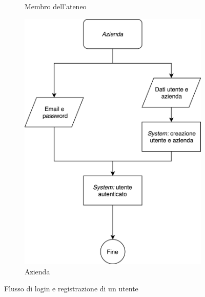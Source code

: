 \begin{figure}[H]
\begin{subfigure}[b]{0.5\textwidth}
		\caption{Membro dell'ateneo}
		\label{fig:univelogin}   
	\end{subfigure}      
	\begin{subfigure}[b]{0.4\textwidth}
		\includegraphics[width=\textwidth]{Chapter3/Figs/companylogin}
		\caption{Azienda}
		\label{fig:companylogin}
	\end{subfigure}
	\caption[Flusso di login e registrazione di un utente]{Flusso di login e registrazione di un utente}
	\label{fig:uc-login}
\end{figure}

